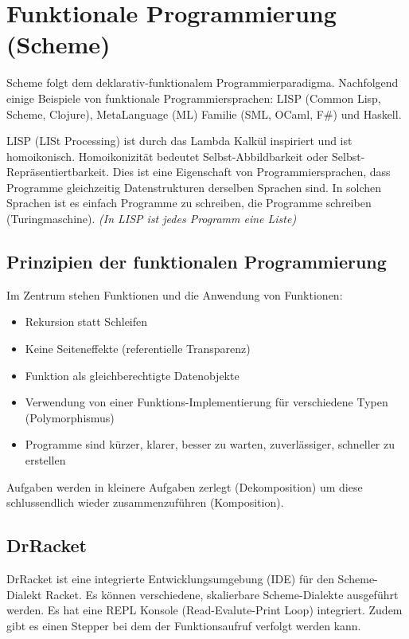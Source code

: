\chapter{Funktionale Programmierung (Scheme)}
Scheme folgt dem deklarativ-funktionalem Programmierparadigma. Nachfolgend einige Beispiele von funktionale Programmiersprachen: LISP (Common Lisp, Scheme, Clojure), MetaLanguage (ML) Familie (SML, OCaml, F\#) und Haskell.

LISP (LISt Processing) ist durch das Lambda Kalkül inspiriert und ist homoikonisch. Homoikonizität bedeutet Selbst-Abbildbarkeit oder Selbst-Repräsentiertbarkeit. Dies ist eine Eigenschaft von Programmiersprachen, dass Programme gleichzeitig Datenstrukturen derselben Sprachen sind. In solchen Sprachen ist es einfach Programme zu schreiben, die Programme schreiben (Turingmaschine). \emph{(In LISP ist jedes Programm eine Liste)}

\section{Prinzipien der funktionalen Programmierung}
Im Zentrum stehen Funktionen und die Anwendung von Funktionen:
\begin{itemize}
	\item Rekursion statt Schleifen
	\item Keine Seiteneffekte (referentielle Transparenz)
	\item Funktion als gleichberechtigte Datenobjekte
	\item Verwendung von einer Funktions-Implementierung für verschiedene Typen (Polymorphismus)
	\item Programme sind kürzer, klarer, besser zu warten, zuverlässiger, schneller zu erstellen
\end{itemize}
Aufgaben werden in kleinere Aufgaben zerlegt (Dekomposition) um diese schlussendlich wieder zusammenzuführen (Komposition).

\section{DrRacket}
DrRacket ist eine integrierte Entwicklungsumgebung (IDE) für den Scheme-Dialekt Racket. Es können verschiedene, skalierbare Scheme-Dialekte ausgeführt werden. Es hat eine REPL Konsole (Read-Evalute-Print Loop) integriert. Zudem gibt es einen Stepper bei dem der Funktionsaufruf verfolgt werden kann.

